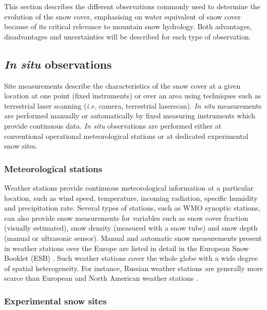 \documentclass[utf8]{frontiersSCNS} %
\begin{document}
This section describes the different observations commonly used to determine the evolution of the snow cover, emphasising on water equivalent of snow cover because of its critical relevance to mountain snow hydrology. Both advantages, disadvantages and uncertainties will be described for each type of observation. 

\subsection{\textit{In situ} observations}
Site measurements describe the characteristics of the snow cover at a given location at one point (fixed instruments) or over an area using techniques such as terrestrial laser scanning (\textit{i.e.} camera, terrestrial laserscan). \textit{In situ} measurements are performed manually or automatically by fixed measuring instruments which provide continuous data. \textit{In situ} observations are performed either at conventional operational meteorological stations or at dedicated experimental snow sites.%

\subsubsection{Meteorological stations}
Weather stations provide continuous meteorological information at a particular location, such as wind speed, temperature, incoming radiation, specific humidity and precipitation rate. Several types of stations, such as WMO synoptic stations, can also provide snow measurements for variables such as snow cover fraction (visually estimated), snow density (measured with a snow tube) and snow depth (manual or ultrasonic sensor). Manual and automatic snow measurements present in weather stations over the Europe are listed in detail in the European Snow Booklet (ESB) \citep{Haberkorn_2019}. Such weather stations cover the whole globe with a wide degree of spatial heterogeneity. For instance, Russian weather stations are generally more scarce than European and North American weather stations \citep{Ripper_2015snowpex}.



\subsubsection{Experimental snow sites}
\end{document}
